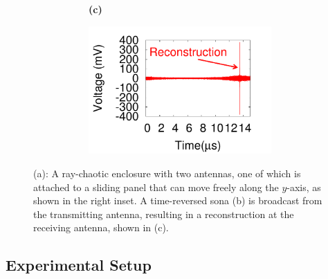 \begin{figure}[]
\begin{subfigure}[]{0.9\columnwidth}
\begin{subfigure}[t]{0.45\columnwidth}
				\caption{\label{fig:sona}}
		\end{subfigure}
	\begin{subfigure}[t]{0.03\columnwidth}
	\textbf{(c)}
	\end{subfigure}
		\begin{subfigure}[t]{0.45\columnwidth}
				\centering
				\includegraphics[width=\columnwidth,valign=t]{figs/recon.pdf}
				\caption{\label{fig:recon}}
		\end{subfigure}
	\end{subfigure}
  \vspace{-1\baselineskip}
	\caption{(a): A ray-chaotic enclosure with two antennas, one of
	which is attached to a sliding panel that can move freely along the $y$-axis,
	as shown in the right inset. A time-reversed sona (b) is broadcast from the
	transmitting antenna, resulting in a reconstruction at the receiving
	antenna, shown in (c).}
	\label{fig:setup}
\vspace{-0.5\baselineskip}
\end{figure}


\subsection{Experimental Setup}

